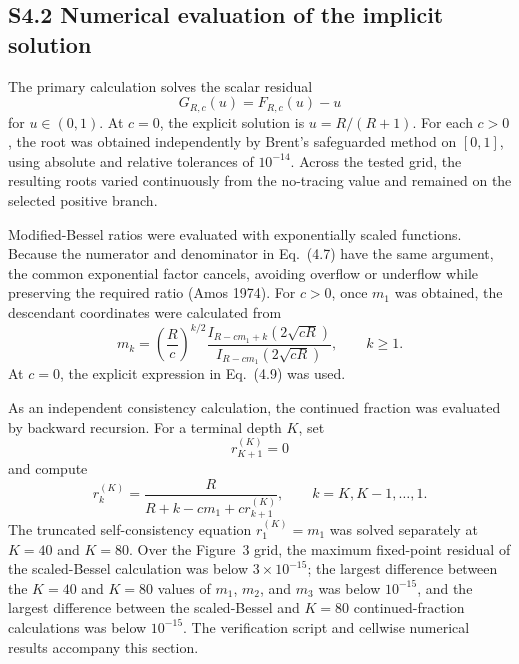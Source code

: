 \documentclass[9pt,a4paper]{article}
\begin{document}
\subsection*{S4.2 Numerical evaluation of the implicit solution}

The primary calculation solves the scalar residual
\begin{equation}
G_{R,c}(u)=F_{R,c}(u)-u
\tag{S4.10}
\end{equation}
for $u\in(0,1)$. At $c=0$, the explicit solution is $u=R/(R+1)$. For each $c>0$, the root was obtained independently by Brent's safeguarded method on $[0,1]$, using absolute and relative tolerances of $10^{-14}$. Across the tested grid, the resulting roots varied continuously from the no-tracing value and remained on the selected positive branch.

Modified-Bessel ratios were evaluated with exponentially scaled functions. Because the numerator and denominator in Eq.~(4.7) have the same argument, the common exponential factor cancels, avoiding overflow or underflow while preserving the required ratio (Amos 1974). For $c>0$, once $m_1$ was obtained, the descendant coordinates were calculated from
\begin{equation}
m_k=\left(\frac{R}{c}\right)^{k/2}\frac{I_{R-cm_1+k}\!\left(2\sqrt{cR}\right)}{I_{R-cm_1}\!\left(2\sqrt{cR}\right)},
\qquad k\geq1.
\tag{S4.11}
\end{equation}
At $c=0$, the explicit expression in Eq.~(4.9) was used.

As an independent consistency calculation, the continued fraction was evaluated by backward recursion. For a terminal depth $K$, set
\begin{equation}
r_{K+1}^{(K)}=0
\tag{S4.12}
\end{equation}
and compute
\begin{equation}
r_k^{(K)}=\frac{R}{R+k-cm_1+cr_{k+1}^{(K)}},
\qquad k=K,K-1,\ldots,1.
\tag{S4.13}
\end{equation}
The truncated self-consistency equation $r_1^{(K)}=m_1$ was solved separately at $K=40$ and $K=80$. Over the Figure~3 grid, the maximum fixed-point residual of the scaled-Bessel calculation was below $3\times10^{-15}$; the largest difference between the $K=40$ and $K=80$ values of $m_1$, $m_2$, and $m_3$ was below $10^{-15}$, and the largest difference between the scaled-Bessel and $K=80$ continued-fraction calculations was below $10^{-15}$. The verification script and cellwise numerical results accompany this section.
\end{document}
